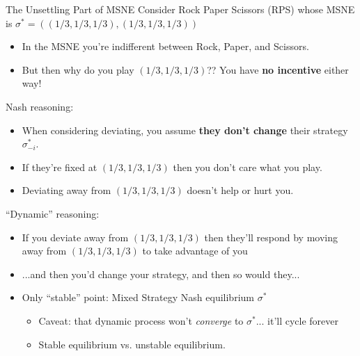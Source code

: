 \begin{frame}{The Unsettling Part of MSNE}
Consider Rock Paper Scissors (RPS) whose MSNE is $\sigma^*=((1/3,1/3,1/3),(1/3,1/3,1/3))$
\begin{itemize}
    \item In the MSNE you're indifferent between Rock, Paper, and Scissors.
    \item But then why do you play $(1/3,1/3,1/3)$?? You have \textbf{no incentive} either way!
\end{itemize}
\bsk
Nash reasoning:
\begin{itemize}
    \item When considering deviating, you assume \textbf{they don't change} their strategy $\sigma_{-i}^*$.
    \item If they're fixed at $(1/3,1/3,1/3)$ then you don't care what you play.
    \item Deviating away from $(1/3,1/3,1/3)$ doesn't help or hurt you.
\end{itemize}
\bsk
``Dynamic'' reasoning:
\begin{itemize}
    \item If you deviate away from $(1/3,1/3,1/3)$ then they'll respond by moving away from $(1/3,1/3,1/3)$ to take advantage of you
    \item ...and then you'd change your strategy, and then so would they...
    \item Only ``stable'' point: Mixed Strategy Nash equilibrium $\sigma^*$
    \begin{itemize}
        \item Caveat: that dynamic process won't \textit{converge} to $\sigma^*$... it'll cycle forever
        \item Stable equilibrium vs. unstable equilibrium. 
    \end{itemize}
\end{itemize}
    
\end{frame}

